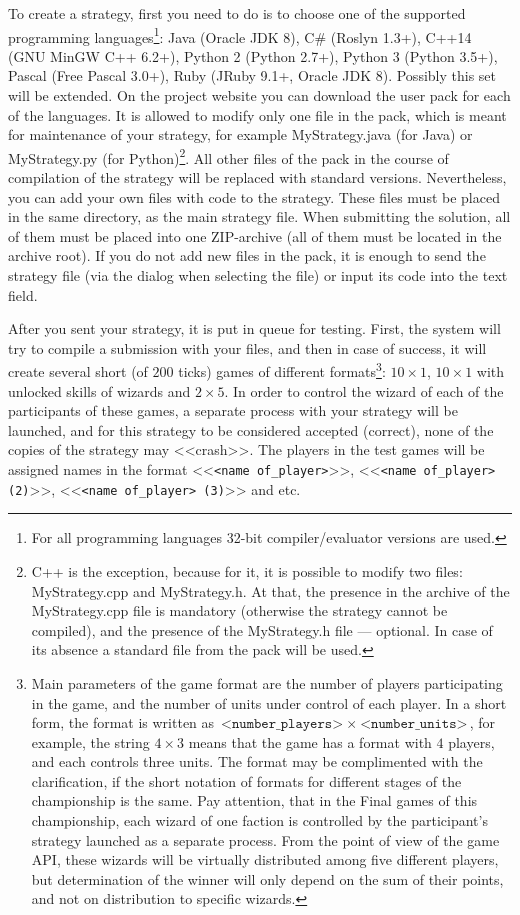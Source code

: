 To create a strategy, first you need to do is to choose one of the supported programming languages\footnote[14]{For all programming languages
32-bit compiler/evaluator versions are used.}: Java (Oracle JDK 8), C\# (Roslyn 1.3+), C++14 (GNU MinGW C++
6.2+), Python 2 (Python 2.7+), Python 3 (Python 3.5+), Pascal (Free Pascal 3.0+), Ruby (JRuby 9.1+, Oracle JDK 8). Possibly this set
will be extended. On the project website you can download the user pack for each of the languages. It is allowed to modify only one
file in the pack, which is meant for maintenance of your strategy, for example MyStrategy.java (for Java) or MyStrategy.py (for
Python)\footnote[15]{C++ is the exception, because for it, it is possible to modify two files: MyStrategy.cpp and MyStrategy.h. At that, the presence
in the archive of the MyStrategy.cpp file is mandatory (otherwise the strategy cannot be compiled), and the presence of the MyStrategy.h file --- optional. In case
of its absence a standard file from the pack will be used.}. All other files of the pack in the course of compilation of the strategy will be replaced
with standard versions. Nevertheless, you can add your own files with code to the strategy. These files must be placed in the same directory, as the
main strategy file. When submitting the solution, all of them must be placed into one ZIP-archive (all of them must be located in the archive root). If
you do not add new files in the pack, it is enough to send the strategy file (via the dialog when selecting the file) or input its code into
the text field.
 
After you sent your strategy, it is put in queue for testing. First, the system will try to compile a submission with your
files, and then in case of success, it will create several short (of $200$ ticks) games of different formats\footnote[16]{Main
parameters of the game format are the number of players participating in the game, and the number of units under control of each player.
In a short form, the format is written as $\texttt{<number\_players>}~\times~\texttt{<number\_units>}$, for example, the string $4\times3$ means
that the game has a format with $4$ players, and each controls three units. The format may be complimented with the clarification, if
the short notation of formats for different stages of the championship is the same. Pay attention, that in the Final games of this championship, each wizard of
one faction is controlled by the participant's strategy launched as a separate process. From the point of view of the game API, these wizards
will be virtually distributed among five different players, but determination of the winner will only depend on the sum of their points, and not on
distribution to specific wizards.}: $10\times1$, $10\times1$ with unlocked skills of wizards and $2\times5$. In order to control
the wizard of each of the participants of these games, a separate process with your strategy will be launched, and for this strategy
to be considered accepted (correct), none of the copies of the strategy may <<crash>>. The players in the test games will be assigned names in the
format <<\texttt{<name of\_player>}>>, <<\texttt{<name of\_player> (2)}>>, <<\texttt{<name of\_player> (3)}>> and etc.

